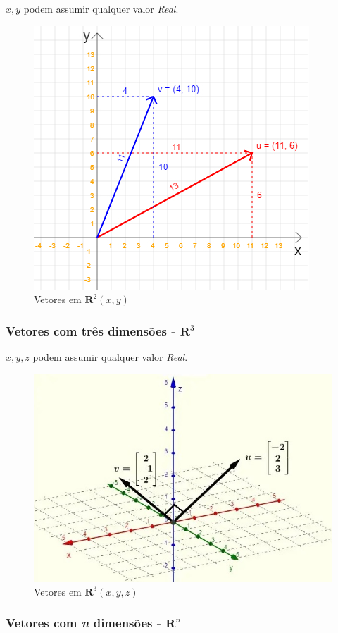 \documentclass[12pt]{article}
\begin{document}
\(x, y\) podem assumir qualquer valor \textit{Real}.

\begin{figure}[H]
	\centering
	\includegraphics[height=.45\textheight]{figuras/vetores_02}
	\caption[Vetores em \( \mathbf{R}^{2} \)]{Vetores em \( \mathbf{R}^{2} (x, y)\)}
	\label{fig:vetores02}
\end{figure}

\newpage

\subsubsection{Vetores com três dimensões - \( \mathbf{R}^{3} \)}

\(x, y, z\) podem assumir qualquer valor \textit{Real}.

\begin{figure}[H]
	\centering
	\includegraphics[width=0.5\linewidth]{"figuras/vetores R3"}
	\caption[Vetores em \( \mathbf{R}^{3} \)]{Vetores em \( \mathbf{R}^{3} (x, y, z)\)}
	\label{fig:vetores-r3}
\end{figure}

\subsubsection{Vetores com \textit{n} dimensões - \( \mathbf{R}^{n} \)}
\end{document}

